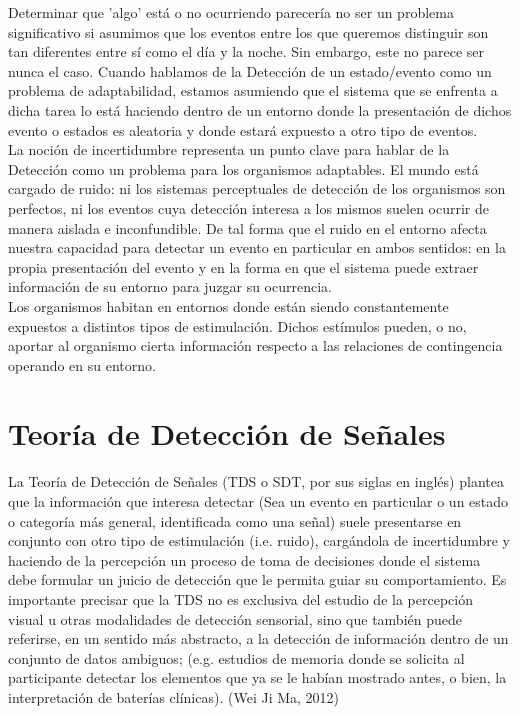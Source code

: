 Determinar que 'algo' está o no ocurriendo parecería no ser un problema significativo si asumimos que los eventos entre los que queremos distinguir son tan diferentes entre sí como el día y la noche. Sin embargo, este no parece ser nunca el caso. Cuando hablamos de la Detección de un estado/evento como un problema de adaptabilidad, estamos asumiendo que el sistema que se enfrenta a dicha tarea lo está haciendo dentro de un entorno donde la presentación de dichos evento o estados es aleatoria y donde estará expuesto a otro tipo de eventos.\\

La noción de incertidumbre representa un punto clave para hablar de la Detección como un problema para los organismos adaptables. El mundo está cargado de ruido: ni los sistemas perceptuales de detección de los organismos son perfectos, ni los eventos cuya detección interesa a los mismos suelen ocurrir de manera aislada e inconfundible. De tal forma que el ruido en el entorno afecta nuestra capacidad para detectar un evento en particular en ambos sentidos: en la propia presentación del evento y en la forma en que el sistema puede extraer información de su entorno para juzgar su ocurrencia.\\

Los organismos habitan en entornos donde están siendo constantemente expuestos a distintos tipos de estimulación. Dichos estímulos pueden, o no, aportar al organismo cierta información respecto a las relaciones de contingencia operando en su entorno. 


\section{Teoría de Detección de Señales}


La Teoría de Detección de Señales (TDS o SDT, por sus siglas en inglés) plantea que la información que  interesa  detectar  (Sea un evento en particular o un estado o categoría más general, identificada como una señal)  suele  presentarse  en  conjunto  con  otro  tipo  de  estimulación (i.e. ruido),  cargándola  de  incertidumbre  y  haciendo de  la  percepción  un  proceso  de  toma  de decisiones  donde  el  sistema  debe  formular  un  juicio  de  detección que  le  permita  guiar  su comportamiento. Es importante precisar  que la TDS no es exclusiva del estudio de la percepción visual  u  otras  modalidades  de  detección  sensorial,  sino  que  también  puede  referirse,  en  un sentido más abstracto, a la detección de información dentro de un conjunto de datos ambiguos; (e.g.  estudios  de  memoria  donde  se  solicita  al  participante  detectar  los  elementos  que  ya  se  le habían mostrado antes, o bien, la interpretación de baterías clínicas). (Wei Ji Ma, 2012)\\

